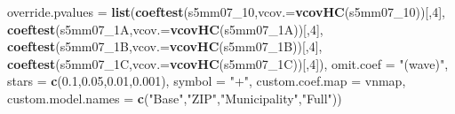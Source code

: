 \documentclass[
]{article}
\newenvironment{Shaded}{\begin{snugshade}}{\end{snugshade}}
\newcommand{\DataTypeTok}[1]{\textcolor[rgb]{0.13,0.29,0.53}{#1}}
\newcommand{\DecValTok}[1]{\textcolor[rgb]{0.00,0.00,0.81}{#1}}
\newcommand{\FloatTok}[1]{\textcolor[rgb]{0.00,0.00,0.81}{#1}}
\newcommand{\KeywordTok}[1]{\textcolor[rgb]{0.13,0.29,0.53}{\textbf{#1}}}
\newcommand{\NormalTok}[1]{#1}
\newcommand{\StringTok}[1]{\textcolor[rgb]{0.31,0.60,0.02}{#1}}
\begin{document}
\begin{Shaded}
\begin{Highlighting}[]
          \DataTypeTok{override.pvalues =} \KeywordTok{list}\NormalTok{(}\KeywordTok{coeftest}\NormalTok{(s5mm07_}\DecValTok{10}\NormalTok{,}\DataTypeTok{vcov.=}\KeywordTok{vcovHC}\NormalTok{(s5mm07_}\DecValTok{10}\NormalTok{))[,}\DecValTok{4}\NormalTok{],}
                                  \KeywordTok{coeftest}\NormalTok{(s5mm07_1A,}\DataTypeTok{vcov.=}\KeywordTok{vcovHC}\NormalTok{(s5mm07_1A))[,}\DecValTok{4}\NormalTok{],}
                                  \KeywordTok{coeftest}\NormalTok{(s5mm07_1B,}\DataTypeTok{vcov.=}\KeywordTok{vcovHC}\NormalTok{(s5mm07_1B))[,}\DecValTok{4}\NormalTok{],}
                                  \KeywordTok{coeftest}\NormalTok{(s5mm07_1C,}\DataTypeTok{vcov.=}\KeywordTok{vcovHC}\NormalTok{(s5mm07_1C))[,}\DecValTok{4}\NormalTok{]),}
          \DataTypeTok{omit.coef =} \StringTok{"(wave)"}\NormalTok{, }\DataTypeTok{stars =} \KeywordTok{c}\NormalTok{(}\FloatTok{0.1}\NormalTok{,}\FloatTok{0.05}\NormalTok{,}\FloatTok{0.01}\NormalTok{,}\FloatTok{0.001}\NormalTok{), }\DataTypeTok{symbol =} \StringTok{"+"}\NormalTok{,}
          \DataTypeTok{custom.coef.map =}\NormalTok{ vnmap, }
          \DataTypeTok{custom.model.names =} \KeywordTok{c}\NormalTok{(}\StringTok{"Base"}\NormalTok{,}\StringTok{"ZIP"}\NormalTok{,}\StringTok{"Municipality"}\NormalTok{,}\StringTok{"Full"}\NormalTok{))}
\end{Highlighting}
\end{Shaded}
\end{document}
